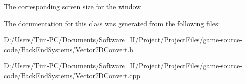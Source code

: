 The corresponding screen size for the window 

The documentation for this class was generated from the following files\+:\begin{DoxyCompactItemize}
\item 
D\+:/\+Users/\+Tim-\/\+P\+C/\+Documents/\+Software\+\_\+\+I\+I/\+Project/\+Project\+Files/game-\/source-\/code/\+Back\+End\+Systems/Vector2\+D\+Convert.\+h\item 
D\+:/\+Users/\+Tim-\/\+P\+C/\+Documents/\+Software\+\_\+\+I\+I/\+Project/\+Project\+Files/game-\/source-\/code/\+Back\+End\+Systems/Vector2\+D\+Convert.\+cpp\end{DoxyCompactItemize}
